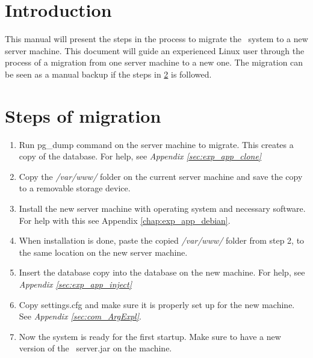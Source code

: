 \label{chap:exp_app_migration}
\section{Introduction}
This manual will present the steps in the process to migrate the \appName\ system to a new server machine. This document will guide an experienced Linux user through the process of a migration from one server machine to a new one. The migration can be seen as a manual backup if the steps in \ref{sec:exp_steps} is followed. 

\section{Steps of migration}\label{sec:exp_steps}
\begin{enumerate}
	\item Run pg\_dump command on the server machine to migrate. This creates a copy of the database. For help, see \emph{Appendix \ref{sec:exp_app_clone}}
	\item Copy the \emph{/var/www/} folder on the current server machine and save the copy to a removable storage device.
	\item Install the new server machine with operating system and necessary software. For help with this see Appendix \ref{chap:exp_app_debian}.
	\item When installation is done, paste the copied \emph{/var/www/} folder from step 2, to the same location on the new server machine. 
	\item Insert the database copy into the database on the new machine. For help, see \emph{Appendix \ref{sec:exp_app_inject}}
	\item Copy settings.cfg and make sure it is properly set up for the new machine. See \emph{Appendix \ref{sec:com_ArgExpl}}.
	\item Now the system is ready for the first startup. Make sure to have a new version of the \appName\ server.jar on the machine.
\end{enumerate}